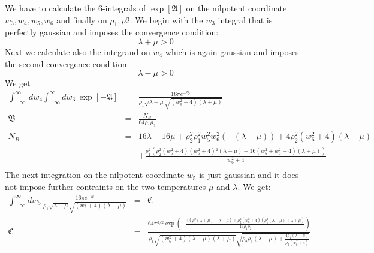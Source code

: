 \documentclass[10pt,a4paper]{article}
\begin{document}
We have to calculate the 6-integrals of $\exp[\mathfrak{A}]$ on the nilpotent coordinate $w_3,w_4,w_5,w_6$ and finally on $\rho_1,\rho2$. We begin with the $w_3$ integral that is perfectly gaussian and imposes the convergence condition:
\begin{equation}\label{condit1}
  \lambda+\mu >0
\end{equation}
Next we calculate also the integrand on $w_4$ which is again gaussian and imposes the second convergence condition:
\begin{equation}\label{condit2}
  \lambda-\mu >0
\end{equation}
We get
\begin{eqnarray}
\label{lianaorfei}
  \int_{-\infty}^{\infty}\, dw_4 \int_{-\infty}^{\infty} dw_3 \, \exp\left[-\mathfrak{A}\right]&=& \frac{16 \pi  e^{-\mathfrak{B}}}{\rho _1 \sqrt{\lambda -\mu } \sqrt{\left(w_6^2+4\right)
   (\lambda +\mu )}} \nonumber\\
 \mathfrak{B} &=& \frac{N_B}{64 \rho _1 \rho _2}\nonumber \\
 N_B &=& 16 \lambda -16 \mu +\rho _2^2 \rho _1^2 w_5^2 w_6^2 (-(\lambda -\mu ))+4 \rho _2^2
   \left(w_6^2+4\right) (\lambda +\mu ) \nonumber\\
 &&+\frac{\rho _1^2
   \left(\rho _2^2 \left(w_5^2+4\right) \left(w_6^2+4\right){}^2 (\lambda -\mu )+16
   \left(w_5^2+w_6^2+4\right) (\lambda +\mu )\right)}{w_6^2+4} \nonumber\\
\end{eqnarray}
The next integration on the nilpotent coordinate $w_5$ is just gaussian and it does not impose further contraints on the two temperatures $\mu$ and $\lambda$. We get:
\begin{eqnarray}\label{paramento}
  \int_{-\infty}^{\infty} dw_5 \, \frac{16 \pi  e^{-\mathfrak{B}}}{\rho _1 \sqrt{\lambda -\mu } \sqrt{\left(w_6^2+4\right)
   (\lambda +\mu )}}& = & \mathfrak{C}\nonumber\\
   \mathfrak{C} & = & \frac{64 \pi ^{3/2} \exp \left(-\frac{4 \left(\rho _1^2 (\lambda +\mu )+\lambda -\mu
   \right)+\rho _2^2 \left(w_6^2+4\right) \left(\rho _1^2 (\lambda -\mu )+\lambda +\mu
   \right)}{16 \rho _1 \rho _2}\right)}{\rho _1 \sqrt{\left(w_6^2+4\right) (\lambda -\mu
   ) (\lambda +\mu )} \sqrt{\rho _2 \rho _1 (\lambda -\mu )+\frac{4 \rho _1 (\lambda
   +\mu )}{\rho _2 \left(w_6^2+4\right)}}}\nonumber\\
\end{eqnarray}
\end{document}
